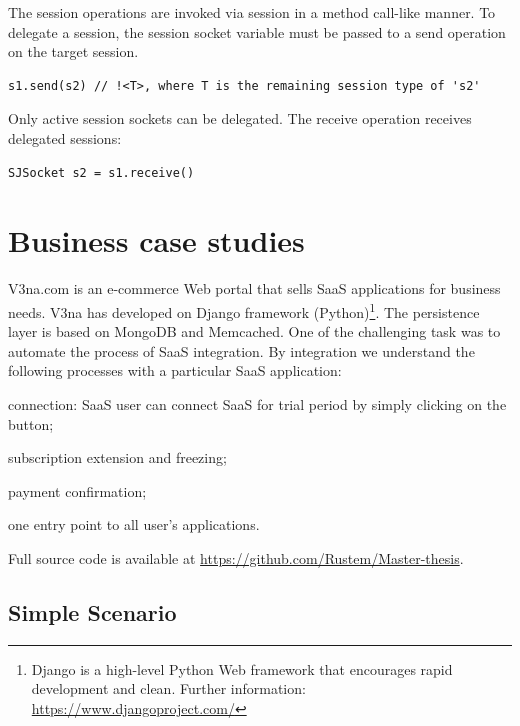 \documentclass{llncs}
\begin{document}
The session operations are invoked via session in a method call-like manner. To delegate a session, the session socket variable must be passed to a send operation on the target session.

\begin{lstlisting}
s1.send(s2) // !<T>, where T is the remaining session type of 's2'
\end{lstlisting}


Only active session sockets can be delegated. The receive operation receives delegated sessions:

\begin{lstlisting}
SJSocket s2 = s1.receive()
\end{lstlisting}

\section{Business case studies}
\label{sect:impl}

V3na.com is an e-commerce Web portal that sells SaaS applications for business needs. V3na has developed on Django framework (Python)\footnote{ Django is a high-level Python Web framework that encourages rapid development and clean. Further information: \url{https://www.djangoproject.com/}}. The persistence layer is based on MongoDB and Memcached. One of the challenging task was to automate the process of SaaS integration. By integration we understand the following processes with a particular SaaS application:

\begin{compactitem}
\item  connection: SaaS user can connect SaaS for trial period by simply clicking on the button;

\item  subscription extension and freezing;

\item  payment confirmation;

\item one entry point to all user's applications.
\end{compactitem}
Full source  code is available at \url{https://github.com/Rustem/Master-thesis}.

\subsection{Simple Scenario}
\end{document}
